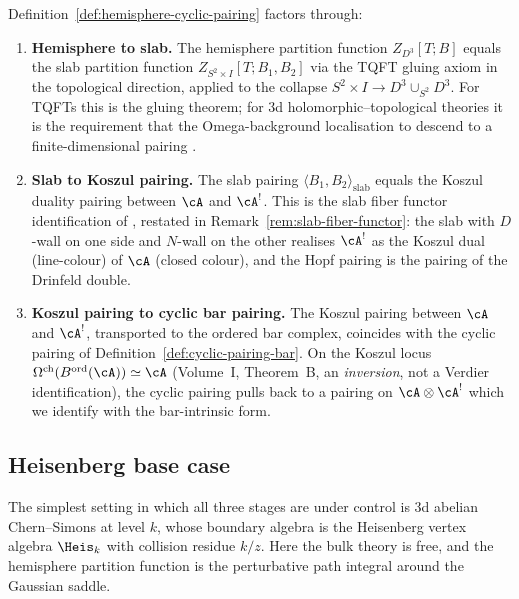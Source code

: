 \begin{remark}
\label{rem:three-stage-identification}
Definition~\ref{def:hemisphere-cyclic-pairing} factors through:
\begin{enumerate}[leftmargin=2em,label=(\roman*)]
\item \textbf{Hemisphere to slab.} The hemisphere partition
function $Z_{D^3}[T;B]$ equals the slab partition function
$Z_{S^2\times I}[T;B_1,B_2]$ via the TQFT gluing axiom in the
topological direction, applied to the collapse $S^2\times I \to
D^3 \cup_{S^2} D^3$. For TQFTs this is the gluing theorem;
for $3$d holomorphic--topological theories it is the requirement that the
Omega-background localisation to descend to a finite-dimensional
pairing \cite{DFPY16}.
\item \textbf{Slab to Koszul pairing.} The slab pairing
$\langle B_1, B_2\rangle_{\mathrm{slab}}$ equals the Koszul
duality pairing between $\cA$ and $\cA^!$. This is the slab
fiber functor identification of \cite{Dimofte25}, restated in
Remark~\ref{rem:slab-fiber-functor}: the slab with $D$-wall on
one side and $N$-wall on the other realises $\cA^!$ as the Koszul
dual (line-colour) of $\cA$ (closed colour), and the Hopf pairing
is the pairing of the Drinfeld double.
\item \textbf{Koszul pairing to cyclic bar pairing.} The Koszul
pairing between $\cA$ and $\cA^!$, transported to the ordered
bar complex, coincides with the cyclic pairing of
Definition~\ref{def:cyclic-pairing-bar}. On the Koszul locus
$\Omega^{\mathrm{ch}}(B^{\mathrm{ord}}(\cA))\simeq \cA$
(Volume~I, Theorem~B, an \emph{inversion}, not a Verdier
identification), the cyclic pairing pulls back to a pairing on
$\cA\otimes \cA^!$ which we identify with the bar-intrinsic
form.
\end{enumerate}
\end{remark}

\subsection{Heisenberg base case}
\label{subsec:heisenberg-base-case}

The simplest setting in which all three stages are under control
is $3$d abelian Chern--Simons at level $k$, whose boundary
algebra is the Heisenberg vertex algebra $\Heis_k$ with
collision residue $k/z$. Here the
bulk theory is free, and the hemisphere partition function is
the perturbative path integral around the Gaussian saddle.

